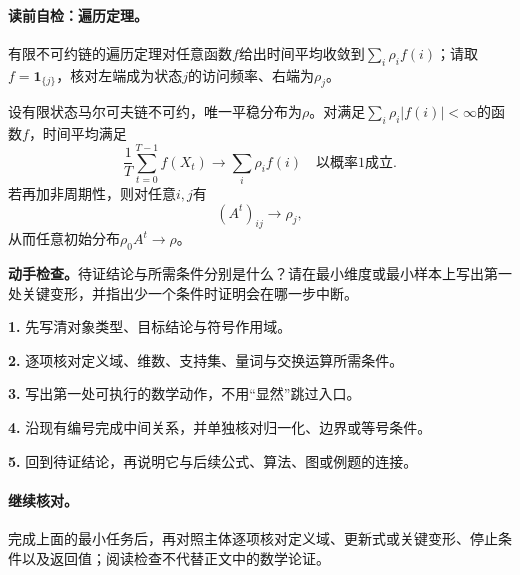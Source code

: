 \paragraph{读前自检：遍历定理。}有限不可约链的遍历定理对任意函数$f$给出时间平均收敛到$\sum_i\rho_if(i)$；请取$f=\mathbf1_{\{j\}}$，核对左端成为状态$j$的访问频率、右端为$\rho_j$。\par

\begin{theorem}[有限不可约链的两类长期行为]\label{thm:V5-C01-ergodic}
设有限状态马尔可夫链不可约，唯一平稳分布为$\rho$。对满足$\sum_i\rho_i|f(i)|<\infty$的函数$f$，时间平均满足
\begin{equation}\label{eq:V5-C01-time-average}
\frac1T\sum_{t=0}^{T-1}f(X_t)\longrightarrow
\sum_i\rho_i f(i)
\quad\text{以概率1成立}.
\end{equation}
若再加非周期性，则对任意$i,j$有
\begin{equation}\label{eq:V5-C01-step-convergence}
(A^t)_{ij}\longrightarrow\rho_j,
\end{equation}
从而任意初始分布$\rho_0A^t\to\rho$。
\end{theorem}
\begin{keypointbox}[title={证明：有限不可约链的两类长期行为：证明阅读检查}]
\textbf{动手检查。}待证结论与所需条件分别是什么？请在最小维度或最小样本上写出第一处关键变形，并指出少一个条件时证明会在哪一步中断。\par
\textbf{1.} 先写清对象类型、目标结论与符号作用域。\par
\textbf{2.} 逐项核对定义域、维数、支持集、量词与交换运算所需条件。\par
\textbf{3.} 写出第一处可执行的数学动作，不用“显然”跳过入口。\par
\textbf{4.} 沿现有编号完成中间关系，并单独核对归一化、边界或等号条件。\par
\textbf{5.} 回到待证结论，再说明它与后续公式、算法、图或例题的连接。
\end{keypointbox}
\paragraph{继续核对。}完成上面的最小任务后，再对照主体逐项核对定义域、更新式或关键变形、停止条件以及返回值；阅读检查不代替正文中的数学论证。

